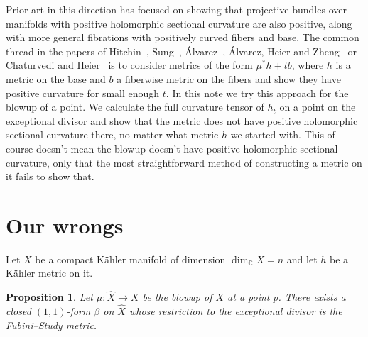 \documentclass[10pt,a4paper]{amsart}
\newtheorem{prop}[theo]{Proposition}
\newcommand{\kk}[1]{\mathbb{#1}}
\def\hsc{holomorphic sectional curvature}
\def\bl#1{\widehat{#1}}
\def\blX{\bl{X}}
\begin{document}
Prior art in this direction has focused on showing that projective bundles
over manifolds with positive \hsc{} are also positive, along with more
general fibrations with positively curved fibers and base.
The common thread in the papers of
Hitchin~\cite{hitchin1975curvature},
Sung~\cite{sung1997kahler},
\'Alvarez~\cite{alvarez2016positive},
\'Alvarez,
Heier and Zheng~\cite{alvarez2018projectivized} or Chaturvedi and
Heier~\cite{chaturvedi2020hermitian}
is to consider metrics of the form $\mu^* h + t b$, where $h$ is a metric
on the base and $b$ a fiberwise metric on the fibers and show they have
positive curvature for small enough $t$.
In this note we try this approach for the blowup of a point.
We calculate the full curvature tensor of $h_t$ on a point on the exceptional
divisor and show that the metric
does not have positive \hsc{} there, no matter what metric $h$ we started with.
This of course doesn't mean the blowup doesn't have positive \hsc{}, only that
the most straightforward method of constructing a metric on it fails to show that.





\section{Our wrongs}

Let $X$ be a compact K\"ahler manifold of dimension $\dim_{\kk C} X = n$
and let $h$ be a K\"ahler metric on it.


\begin{prop}
\label{prop:fs}
Let $\mu : \bl X \to X$ be the blowup of $X$ at a point $p$.
There exists a closed $(1,1)$-form $\beta$ on $\blX$ whose restriction to
the exceptional divisor is the Fubini--Study metric.
\end{prop}
\end{document}
